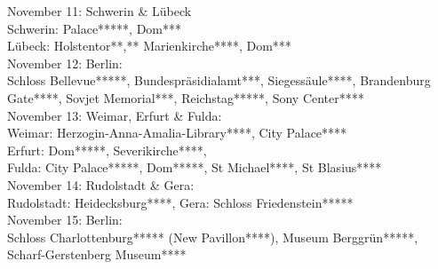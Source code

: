 November 11: Schwerin \& L\"ubeck\\
Schwerin: Palace*****, Dom***\\
 L\"ubeck: Holstentor**,** Marienkirche****, Dom***\\

November 12: Berlin:\\
Schloss Bellevue*****, Bundespr\"asidialamt***, Siegess\"aule****, Brandenburg Gate****, Sovjet Memorial***, Reichstag*****, Sony Center****\\

November 13: Weimar, Erfurt \& Fulda:\\
Weimar: Herzogin-Anna-Amalia-Library****, City Palace****\\
Erfurt: Dom*****, Severikirche****, \\
Fulda: City Palace*****, Dom*****, St Michael****, St Blasius****\\

November 14: Rudolstadt \& Gera:\\
Rudolstadt: Heidecksburg****, Gera: Schloss Friedenstein*****\\

November 15: Berlin:\\
Schloss Charlottenburg***** (New Pavillon****), Museum Berggr\"un*****, Scharf-Gerstenberg Museum****